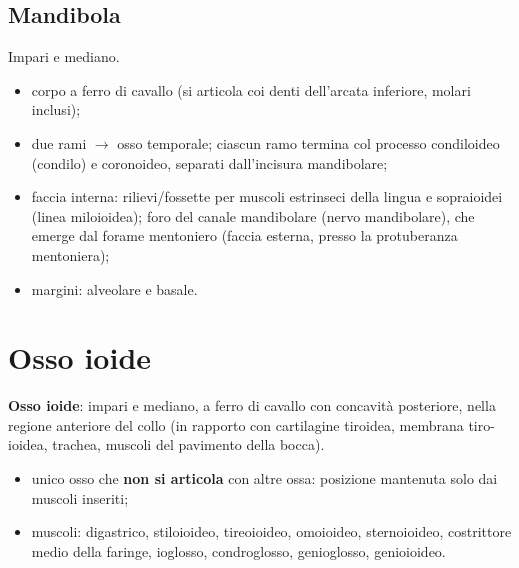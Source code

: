 \subsection{Mandibola}
Impari e mediano.
\begin{itemize}
  \item corpo a ferro di cavallo (si articola coi denti dell'arcata inferiore, molari inclusi);
  \item due rami $\rightarrow$ osso temporale; ciascun ramo termina col processo condiloideo
    (condilo) e coronoideo, separati dall'incisura mandibolare;
  \item faccia interna: rilievi/fossette per muscoli estrinseci della lingua e sopraioidei (linea
    miloioidea); foro del canale mandibolare (nervo mandibolare), che emerge dal forame mentoniero
    (faccia esterna, presso la protuberanza mentoniera);
  \item margini: alveolare e basale.
\end{itemize}

\section{Osso ioide}

\textbf{Osso ioide}: impari e mediano, a ferro di cavallo con concavità posteriore, nella regione
anteriore del collo (in rapporto con cartilagine tiroidea, membrana tiro-ioidea, trachea, muscoli
del pavimento della bocca).
\begin{itemize}
  \item unico osso che \textbf{non si articola} con altre ossa: posizione mantenuta solo dai
    muscoli inseriti;
  \item muscoli: digastrico, stiloioideo, tireoioideo, omoioideo, sternoioideo, costrittore medio
    della faringe, ioglosso, condroglosso, genioglosso, genioioideo.
\end{itemize}

